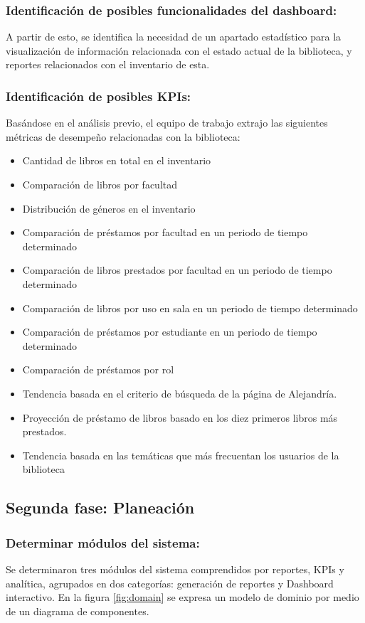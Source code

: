 \documentclass[spanish]{ieee_upb}
\begin{document}
\subsubsection{Identificación de posibles funcionalidades del dashboard: } A partir de esto,  se identifica la necesidad de un apartado estadístico para la visualización de información relacionada con el estado actual de la biblioteca, y reportes relacionados con el inventario de esta.

\vspace{0.3cm}
\subsubsection{Identificación de posibles KPIs: } 
Basándose en el análisis previo, el equipo de trabajo extrajo las siguientes métricas de desempeño relacionadas con la biblioteca:

\begin{itemize}
    \item Cantidad de libros en total en el inventario
    \item Comparación de libros por facultad
    \item Distribución de géneros en el inventario
    \item Comparación de préstamos por facultad en un periodo de tiempo determinado
    \item Comparación de libros prestados por facultad en un periodo de tiempo determinado
    \item Comparación de libros por uso en sala en un periodo de tiempo determinado
    \item Comparación de préstamos por estudiante en un periodo de tiempo determinado
    \item Comparación de préstamos por rol
    \item Tendencia basada en el criterio de búsqueda de la página de Alejandría.
    \item Proyección de préstamo de libros basado en los diez primeros libros más prestados.
    \item Tendencia basada en las temáticas que más frecuentan los usuarios de la biblioteca
\end{itemize}


\subsection{Segunda fase: Planeación}
\subsubsection{Determinar módulos del sistema: } Se determinaron tres módulos del sistema comprendidos por reportes, KPIs y analítica, agrupados en dos categorías: generación de reportes y Dashboard interactivo. En la figura \ref{fig:domain} se expresa un modelo de dominio por medio de un diagrama de componentes.
\end{document}
